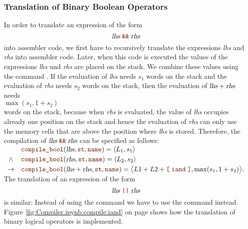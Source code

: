 \subsubsection{Translation of Binary Boolean Operators}
In order to translate an expression of the form
\[ \textsl{lhs} \;\mytt{\&\&}\; \textsl{rhs} \]
into assembler code, we first have to recursively translate the expressions \textsl{lhs} and
\textsl{rhs} into assembler code.  Later, when this code is executed the values of the expressions
\textsl{lhs} und \textsl{rhs} are placed on the stack.  We combine these values using the command .
If the evaluation of \textsl{lhs} needs $s_1$ words on the stack and the evaluation of \textsl{rhs} needs $s_2$
words on the stack, then the evaluation of $\textsl{lhs} + \textsl{rhs}$ needs 
\\[0.2cm]
\hspace*{1.3cm}
$\max(s_1, 1 + s_2)$
\\[0.2cm]
words on the stack, because when \textsl{rhs} is evaluated, the value of \textsl{lhs} occupies already one position
on the stack and hence the evaluation of \textsl{rhs} can only use the memory cells that are above the position
where \textsl{lhs} is stored. Therefore, the compilation of $\textsl{lhs} \;\mytt{\&\&}\; \textsl{rhs}$ can be
specified as follows:
\\[0.2cm]
\hspace*{1.3cm}
$
\begin{array}[t]{cll}
        & \mytt{compile\_bool}(\textsl{lhs}, \mytt{st}, \mytt{name}) = \pair(L_1, s_1)  \\[0.1cm]
\wedge  & \mytt{compile\_bool}(\textsl{rhs}, \mytt{st}, \mytt{name}) = \pair(L_2, s_2)  \\[0.1cm]
\rightarrow & \mytt{compile\_bool}(\textsl{lhs} + \textsl{rhs}, \mytt{st}, \mytt{name}) = 
            \bigl\langle L1 + L2 + \mytt{[}\; \mytt{iand} \;\mytt{]}, \max(s_1, 1+s_2) \bigr\rangle.
\end{array}$
\\[0.2cm]
The translation of an expression of the form
\[ \textsl{lhs} \;\mytt{||}\; \textsl{rhs} \]
is similar:  Instead of using the command  we have to use the command  instead.
Figure \ref{fig:Compiler.ipynb:compile:iand} on page \pageref{fig:Compiler.ipynb:compile:iand} shows how the
translation of binary logical operators is implemented.

